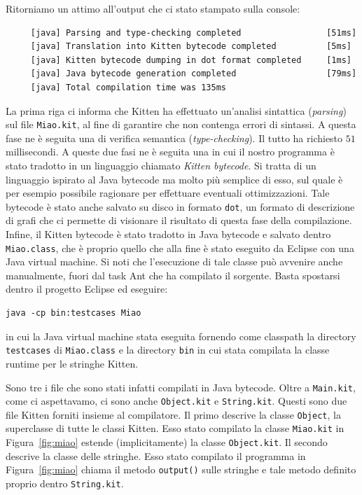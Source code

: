Ritorniamo un attimo all'output che ci \e stato stampato sulla console:
%
\begin{verbatim}
     [java] Parsing and type-checking completed                 [51ms]
     [java] Translation into Kitten bytecode completed          [5ms]
     [java] Kitten bytecode dumping in dot format completed     [1ms]
     [java] Java bytecode generation completed                  [79ms]
     [java] Total compilation time was 135ms
\end{verbatim}
%
La prima riga ci informa che Kitten ha effettuato un'analisi sintattica
(\emph{parsing}) sul file \texttt{Miao.kit}, al fine di garantire che non
contenga errori di sintassi. A questa fase ne \`e seguita una di verifica
semantica (\emph{type-checking}). Il tutto ha richiesto $51$ millisecondi.
A queste due fasi ne \`e seguita una in cui il nostro programma \`e
stato tradotto in un linguaggio chiamato \emph{Kitten bytecode}. Si tratta
di un linguaggio ispirato al Java bytecode ma molto pi\`u semplice di esso,
sul quale \`e per esempio possibile
ragionare per effettuare eventuali ottimizzazioni. Tale bytecode \`e
stato anche salvato su disco in formato \texttt{dot}, un
formato di descrizione di grafi che ci permette di visionare il risultato
di questa fase della compilazione. Infine, il Kitten bytecode \`e stato
tradotto in Java bytecode e salvato dentro \texttt{Miao.class},
che \`e proprio quello che alla fine \`e stato eseguito da Eclipse
con una Java virtual machine. Si noti che l'esecuzione di tale classe
pu\`o avvenire anche manualmente, fuori dal task Ant che ha compilato
il sorgente. Basta spostarsi dentro il progetto Eclipse ed eseguire:
%
\begin{verbatim}
java -cp bin:testcases Miao
\end{verbatim}
%
in cui la Java virtual machine \e stata eseguita fornendo come classpath
la directory \texttt{testcases} di \texttt{Miao.class} e la directory
\texttt{bin} in cui \e stata compilata la classe runtime
per le stringhe Kitten.

Sono tre i file che sono stati infatti compilati in Java
bytecode. Oltre a \texttt{Main.kit}, come ci aspettavamo, ci sono anche
\texttt{Object.kit} e \texttt{String.kit}. Questi sono due file Kitten
forniti insieme al compilatore. Il primo descrive la
classe \texttt{Object}, \cioe la superclasse di tutte le classi
Kitten. Esso \e stato compilato \poiche la classe \texttt{Miao.kit}
in Figura~\ref{fig:miao} estende (implicitamente) la classe
\texttt{Object.kit}. Il secondo descrive la classe delle stringhe.
Esso \e stato compilato \poiche il programma in Figura~\ref{fig:miao}
chiama il metodo \texttt{output()} sulle stringhe e tale metodo \e
definito proprio dentro \texttt{String.kit}.

